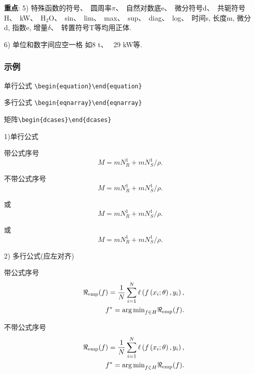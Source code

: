 \documentclass{setp-new}
\begin{document}
{\bf 重点}: 5) 特殊函数的符号、~圆周率$\pi$、~自然对数底e、~微分符号d、~共轭符号H、~kW、~H$_2$O、~sin、~lim、~max、~sup、~diag、~log、~时间s, 长度m, 微分d, 指数e, 增量$\delta$、~转置符号T等均用正体.

6) 单位和数字间应空一格 如8 t、 ~29 kW等.


\subsubsection{示例}

单行公式 \verb|\begin{equation}\end{equation}|

多行公式 \verb|\begin{eqnarray}\end{eqnarray}|

矩阵\verb|\begin{dcases}\end{dcases}|



1)单行公式

 带公式序号
 \begin{equation}
    M = mN^{1}_{R} + mN^{1}_{S}/\rho.
\end{equation}

 不带公式序号
 \begin{equation*}
    M = mN^{1}_{R} + mN^{1}_{S}/\rho.
\end{equation*}

或
 \begin{equation}
    M = mN^{1}_{R} + mN^{1}_{S}/\rho.\nonumber
\end{equation}

或
$$    M = mN^{1}_{R} + mN^{1}_{S}/\rho.$$



2) 多行公式(应左对齐)

 带公式序号
\begin{eqnarray}
&&\Re_{\rm e m p}(f)=\frac{1}{N} \sum_{i=1}^{N}
\ell\left(f\left(x_{i}; \theta\right), y_{i}\right),\\&&
f^{*}={\arg \min}_{f \in H}   \Re_{\rm e m p}(f).
\end{eqnarray}

 不带公式序号
\begin{eqnarray*}
&&\Re_{\rm e m p}(f)=\frac{1}{N} \sum_{i=1}^{N}
\ell\left(f\left(x_{i}; \theta\right), y_{i}\right),\\&&
f^{*}={\arg \min}_{f \in H}   \Re_{\rm e m p}(f).
\end{eqnarray*}%
\end{document}

